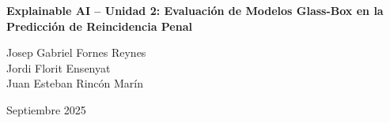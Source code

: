 \documentclass[11pt,a4paper]{article}
\begin{document}
\begin{titlepage}
  \thispagestyle{empty}
  \centering

  \vspace*{\fill} %

{\Huge \textbf{Explainable AI – Unidad 2: Evaluación de Modelos Glass-Box en la Predicción de Reincidencia Penal}\par}

  \vspace{1cm}

  {\Large
  Josep Gabriel Fornes Reynes\\
  Jordi Florit Ensenyat\\
  Juan Esteban Rincón Marín\par}

  \vspace{1.2cm}

  {\large Septiembre 2025\par}

  \vspace*{\fill} %
\end{titlepage}

\clearpage









\printbibliography

% 
\end{document}
